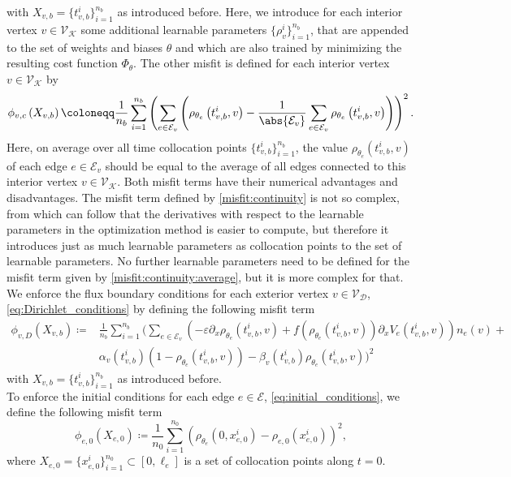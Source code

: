 with $X_{v,b} = \{t_{v,b}^i\}_{i=1}^{n_b}$ as introduced before. Here, we introduce for each interior vertex $v \in \mathcal{V}_\mathcal{K}$ some additional learnable parameters $\{\rho_{v}^i\}_{i=1}^{n_b}$, that are appended to the set of weights and biases $\theta$ and which are also trained by minimizing the resulting cost function $\Phi_\theta$. The other misfit is defined for each interior vertex $v \in \mathcal{V}_\mathcal{K}$ by 
\begin{equation} 
    \label{misfit:continuity:average}
    \phi_{v,c}  \left( X_{v,b} \right) \coloneqq \frac{1}{n_b}  \sum_{i=1}^{n_b} \left( \sum_{e \in \mathcal{E}_v} \left( \rho_{\theta_e}  \left( t_{v,b}^i, v \right) - \frac{1}{\abs{\mathcal{E}_v}} \sum_{e \in \mathcal{E}_v} \rho_{\theta_e}  \left( t_{v,b}^i, v \right) \right) \right)^2.
\end{equation}
Here, on average over all time collocation points $\{t_{v,b}^i\}_{i=1}^{n_b}$, the value $\rho_{\theta_e}  \left( t_{v,b}^i, v \right)$ of each edge $e \in \mathcal{E}_v$ should be equal to the average of all edges connected to this interior vertex $v \in \mathcal{V}_\mathcal{K}$. Both misfit terms have their numerical advantages and disadvantages. The misfit term defined by \cref{misfit:continuity} is not so complex, from which can follow that the derivatives with respect to the learnable parameters in the optimization method is easier to compute, but therefore it introduces just as much learnable parameters as collocation points to the set of learnable parameters. No further learnable parameters need to be defined for the misfit term given by \cref{misfit:continuity:average}, but it is more complex for that. \\
We enforce the flux boundary conditions for each exterior vertex $v \in \mathcal{V}_\mathcal{D}$, \cref{eq:Dirichlet_conditions} by defining the following misfit term  
\begin{align} 
    \label{misfit:Dirichlet}
    \phi_{v,D}  \left( X_{v,b} \right) \coloneqq & \frac{1}{n_b} \sum_{i=1}^{n_b} \bigg( \sum_{e \in \mathcal{E}_v} \left(- \varepsilon \partial_x \rho_{\theta_e}  \left( t_{v,b}^i, v \right) + f\left(\rho_{\theta_e}  \left( t_{v,b}^i, v \right)\right) \partial_x V_e\left( t_{v,b}^i, v \right) \right) n_e  \left( v \right) + \\
    & \alpha_v \left( t_{v,b}^i \right)  \left( 1- \rho_{\theta_e}  \left( t_{v,b}^i, v \right) \right) - \beta_v \left( t_{v,b}^i \right) \rho_{\theta_e}  \left( t_{v,b}^i, v \right) \bigg)^2
\end{align}
with $X_{v,b} = \{t_{v,b}^i\}_{i=1}^{n_b}$ as introduced before. \\
To enforce the initial conditions for each edge $e \in \mathcal{E}$, \cref{eq:initial_conditions}, we define the following misfit term  
\begin{equation} 
    \label{misfit:initial}
    \phi_{e,0}  \left( X_{e,0} \right) \coloneqq \frac{1}{n_0} \sum_{i=1}^{n_0}  \left( \rho_{\theta_e}  \left( 0,x_{e,0}^i \right) - \rho_{e,0} \left( x_{e,0}^i \right) \right)^2, 
\end{equation} 
where $X_{e,0} = \{x_{e,0}^i\}_{i=1}^{n_0} \subset [0, \ell_e]$ is a set of collocation points along $t=0$. \\ 

